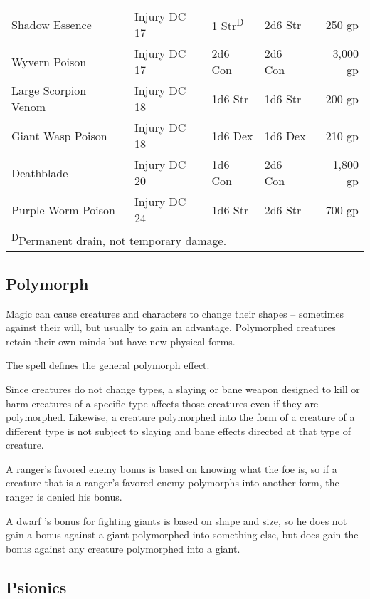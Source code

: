 \begin{table}[htb]
\begin{tabular}{l l l l r}
Shadow Essence & Injury DC 17 & 1 Str\textsuperscript{D} & 2d6 Str & 250 gp\\
Wyvern Poison & Injury DC 17 & 2d6 Con & 2d6 Con & 3,000 gp\\
Large Scorpion Venom & Injury DC 18 & 1d6 Str & 1d6 Str & 200 gp\\
Giant Wasp Poison & Injury DC 18 & 1d6 Dex & 1d6 Dex & 210 gp\\
Deathblade & Injury DC 20 & 1d6 Con & 2d6 Con & 1,800 gp\\
Purple Worm Poison & Injury DC 24 & 1d6 Str & 2d6 Str & 700 gp\\
\multicolumn{5}{l}{\textsuperscript{D}Permanent drain, not temporary damage.}\\
\end{tabular}
\end{table}

\subsection{Polymorph}

Magic can cause creatures and characters to change their shapes -- sometimes against 
their will, but usually to gain an advantage. Polymorphed creatures retain their 
own minds but have new physical forms.

The  spell defines the general polymorph effect.

Since creatures do not change types, a slaying or bane weapon designed to kill 
or harm creatures of a specific type affects those creatures even if they are polymorphed. 
Likewise, a creature polymorphed into the form of a creature of a different type 
is not subject to slaying and bane effects directed at that type of creature. 

A ranger's favored enemy bonus is based on knowing what the foe is, so if a creature 
that is a ranger's favored enemy polymorphs into another form, the ranger is denied 
his bonus.

A dwarf 's bonus for fighting giants is based on shape and size, so he does not 
gain a bonus against a giant polymorphed into something else, but does gain the 
bonus against any creature polymorphed into a giant.

\subsection{Psionics}

